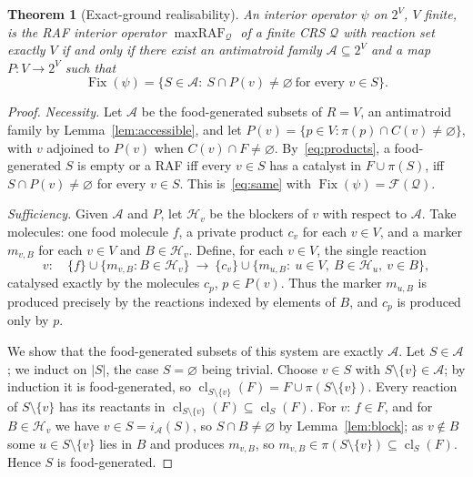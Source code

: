 \documentclass[11pt,a4paper]{article}
\theoremstyle{plain}
\newtheorem{theorem}{Theorem}[section]
\theoremstyle{definition}
\theoremstyle{remark}
\newcommand{\FF}{\mathcal F}
\newcommand{\AAf}{\mathcal A}
\newcommand{\HH}{\mathcal H}
\newcommand{\QQ}{\mathcal Q}
\newcommand{\cl}{\operatorname{cl}}
\newcommand{\mraf}{\operatorname{maxRAF}}
\DeclareMathOperator{\Fix}{Fix}
\begin{document}
\begin{theorem}[Exact-ground realisability]\label{thm:same}
An interior operator $\psi$ on $2^V$, $V$ finite, is the RAF interior operator
$\mraf_\QQ$ of a finite CRS $\QQ$ with reaction set exactly $V$ if and only if there exist
an antimatroid family $\AAf\subseteq2^V$ and a map $P:V\to2^V$ such that
\begin{equation}\label{eq:same}
\Fix(\psi)=\{S\in\AAf:\ S\cap P(v)\neq\varnothing\ \text{for every } v\in S\}.
\end{equation}
\end{theorem}
\begin{proof}
\emph{Necessity.} Let $\AAf$ be the food-generated subsets of $R=V$, an antimatroid family by
Lemma~\ref{lem:accessible}, and let $P(v)=\{p\in V:\pi(p)\cap C(v)\neq\varnothing\}$, with $v$
adjoined to $P(v)$ when $C(v)\cap F\neq\varnothing$. By~\eqref{eq:products}, a food-generated
$S$ is empty or a RAF iff every $v\in S$ has a catalyst in $F\cup\pi(S)$, iff
$S\cap P(v)\neq\varnothing$ for every $v\in S$. This is~\eqref{eq:same} with $\Fix(\psi)=\FF(\QQ)$.

\emph{Sufficiency.} Given $\AAf$ and $P$, let $\HH_v$ be the blockers of $v$ with respect
to $\AAf$. Take molecules: one food molecule $f$, a private product $c_v$ for each $v\in V$,
and a marker $m_{v,B}$ for each $v\in V$ and $B\in\HH_v$. Define, for each $v\in V$, the
single reaction
\begin{equation}\label{eq:marker}
v:\quad \{f\}\cup\{m_{v,B}:B\in\HH_v\}\ \longrightarrow\ \{c_v\}\cup\{m_{u,B}:\ u\in V,\ B\in\HH_u,\ v\in B\},
\end{equation}
catalysed exactly by the molecules $c_p$, $p\in P(v)$. Thus the marker $m_{u,B}$ is produced
precisely by the reactions indexed by elements of $B$, and $c_p$ is produced only by $p$.

We show that the food-generated subsets of this system are exactly $\AAf$. Let $S\in\AAf$;
we induct on $|S|$, the case $S=\varnothing$ being trivial. Choose $v\in S$ with
$S\setminus\{v\}\in\AAf$; by induction it is food-generated, so
$\cl_{S\setminus\{v\}}(F)=F\cup\pi(S\setminus\{v\})$. Every reaction of $S\setminus\{v\}$ has
its reactants in $\cl_{S\setminus\{v\}}(F)\subseteq\cl_S(F)$. For $v$: $f\in F$, and for
$B\in\HH_v$ we have $v\in S=i_\AAf(S)$, so $S\cap B\neq\varnothing$ by Lemma~\ref{lem:block};
as $v\notin B$ some $u\in S\setminus\{v\}$ lies in $B$ and produces $m_{v,B}$, so
$m_{v,B}\in\pi(S\setminus\{v\})\subseteq\cl_S(F)$. Hence $S$ is food-generated.


\end{proof}
\end{document}
